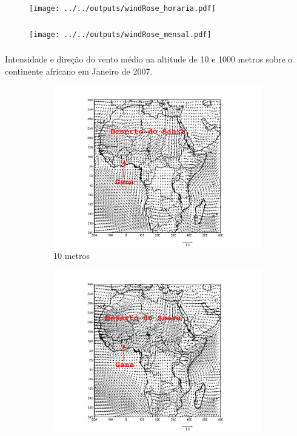\begin{frame}
	\frametitle{}
	\begin{figure}[H]
		\centering
		\texttt{[image: ../../outputs/windRose\_horaria.pdf]}
	\end{figure}
\end{frame}

\begin{frame}
	\frametitle{}
	\begin{figure}[H]
	\centering
		\texttt{[image: ../../outputs/windRose\_mensal.pdf]}
    \end{figure}
\end{frame}

\begin{frame}
\frametitle{}
Intensidade e direção do vento médio na altitude de 
10 e 1000 metros sobre o continente africano em Janeiro de 2007.
\begin{figure}[H]
\centering
  \begin{subfigure}[b]{0.5\linewidth}
    \includegraphics[width=1.3\linewidth]{../../inputs/grads/gimp/1000hPa/JAN_2008.pdf}
    \caption{10 metros}
  \end{subfigure}%
  \begin{subfigure}[b]{0.5\linewidth}
    \includegraphics[width=1.3\linewidth]{../../inputs/grads/gimp/875hPa/JAN_2008.pdf}

\end{subfigure}
\end{figure}
\end{frame}
